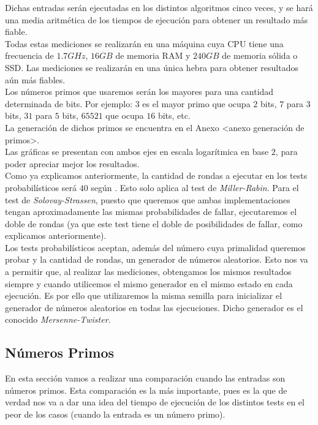 Dichas entradas serán ejecutadas en los distintos algoritmos cinco veces, y se hará una media aritmética de los tiempos de ejecución para obtener un resultado más fiable.\\

Todas estas mediciones se realizarán en una máquina cuya CPU tiene una frecuencia de $1.7GHz$, $16GB$ de memoria RAM y $240GB$ de memoria sólida o SSD. Las mediciones se realizarán en una única hebra para obtener resultados aún más fiables.\\

Los números primos que usaremos serán los mayores para una cantidad determinada de bits. Por ejemplo: $3$ es el mayor primo que ocupa $2$ bits, $7$ para $3$ bits, $31$ para $5$ bits, $65521$ que ocupa $16$ bits, etc.\\

La generación de dichos primos se encuentra en el Anexo <anexo generación de primos>.\\

Las gráficas se presentan con ambos ejes en escala logarítmica en base $2$, para poder apreciar mejor los resultados.\\

Como ya explicamos anteriormente, la cantidad de rondas a ejecutar en los tests probabilísticos será $40$ según \cite{digital_signature_standard}. Esto solo aplica al test de \textit{Miller-Rabin}. Para el test de \textit{Solovay-Strassen}, puesto que queremos que ambas implementaciones tengan aproximadamente las mismas probabilidades de fallar, ejecutaremos el doble de rondas (ya que este test tiene el doble de posibilidades de fallar, como explicamos anteriormente).\\

Los tests probabilísticos aceptan, además del número cuya primalidad queremos probar y la cantidad de rondas, un generador de números aleatorios. Esto nos va a permitir que, al realizar las mediciones, obtengamos los mismos resultados siempre y cuando utilicemos el mismo generador en el mismo estado en cada ejecución. Es por ello que utilizaremos la misma semilla para inicializar el generador de números aleatorios en todas las ejecuciones. Dicho generador es el conocido \textit{Mersenne-Twister}.

\subsection{Números Primos}

En esta sección vamos a realizar una comparación cuando las entradas son números primos. Esta comparación es la más importante, pues es la que de verdad nos va a dar una idea del tiempo de ejecución de los distintos tests en el peor de los casos (cuando la entrada es un número primo).\\

